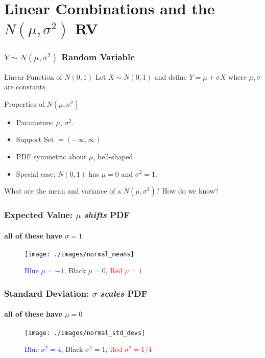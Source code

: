\section{Linear Combinations and the $N(\mu, \sigma^2)$ RV}
\begin{frame}
  \frametitle{$Y \sim N(\mu, \sigma^2)$ Random Variable}

  \begin{block}{Linear Function of $N(0,1)$}
    Let $X \sim N(0,1)$ and define $Y = \mu + \sigma X$ where $\mu,\sigma$ are constants. 
  \end{block}


  \begin{block}{Properties of $N(\mu, \sigma^2)$}
    \begin{itemize}
      \item Parameters: $\mu$, $\sigma^2$.
      \item Support Set $=(-\infty,\infty)$
      \item PDF symmetric about $\mu$, bell-shaped. 
      \item Special case: $N(0,1)$ has $\mu=0$ and $\sigma^2 = 1$. 
    \end{itemize}
  \end{block}

  \alert{What are the mean and variance of a $N(\mu, \sigma^2)$? How do we know?}
\end{frame}
\begin{frame}
  \frametitle{Expected Value: $\mu$ \emph{shifts} PDF}
\framesubtitle{all of these have $\sigma=1$}

\begin{figure}
\texttt{[image: ./images/normal\_means]}
\caption{\textcolor{blue}{Blue $\mu = -1$},
Black $\mu = 0$,
\textcolor{red}{Red $\mu = 1$}}
\end{figure}
\end{frame}



\begin{frame}
  \frametitle{Standard Deviation: $\sigma$ \emph{scales} PDF}
\framesubtitle{all of these have $\mu=0$}

\begin{figure}
\texttt{[image: ./images/normal\_std\_devs]}
\caption{\textcolor{blue}{Blue $\sigma^2 = 4$},
Black $\sigma^2=1$,
\textcolor{red}{Red $\sigma^2= 1/4$}}
\end{figure}
\end{frame}

